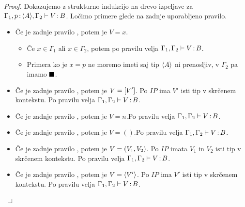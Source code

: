 \begin{proof}
	Dokazujemo z strukturno indukcijo na drevo izpeljave za $\Gamma_1, p \mathinner{:} \langle A \rangle, \Gamma_2 \vdash V \mathinner{:} B$.
	Ločimo primere glede na zadnje uporabljeno pravilo.
	
	\begin{itemize}
		\item Če je zadnje pravilo , potem je $V = x$.
		\begin{itemize}
			\item Če $x \in \Gamma_1$ ali $x \in \Gamma_2$, potem po pravilu  velja $\Gamma_1, \Gamma_2 \vdash V \mathinner{:} B$.
			
			\item Primera ko je $x = p$ ne moremo imeti saj tip $\langle A \rangle$ ni prenosljiv, v $\Gamma_2$ pa imamo $\blacksquare$.
		\end{itemize}
		 
		
		\item Če je zadnje pravilo , potem je $V = [V']$.
		Po $IP$ ima $V'$ isti tip v skrčenem kontekstu.
		Po pravilu  velja $\Gamma_1, \Gamma_2 \vdash V \mathinner{:} B$.
		
		\item Če je zadnje pravilo , potem je $V = n$.Po pravilu  velja $\Gamma_1, \Gamma_2 \vdash V \mathinner{:} B$.

		\item Če je zadnje pravilo , potem je $V = ()$.Po pravilu  velja $\Gamma_1, \Gamma_2 \vdash V \mathinner{:} B$.
		
		\item Če je zadnje pravilo , potem je $V =( V_1 , V_2 )$.
		Po $IP$ imata $V_1$ in $V_2$ isti tip v skrčenem kontekstu.
		Po pravilu  velja $\Gamma_1, \Gamma_2 \vdash V \mathinner{:} B$.
		
		\item Če je zadnje pravilo , potem je $V = \langle V' \rangle$.
		Po $IP$ ima $V'$ isti tip v skrčenem kontekstu.
		Po pravilu  velja $\Gamma_1, \Gamma_2 \vdash V \mathinner{:} B$.
		

\end{itemize}
\end{proof}
